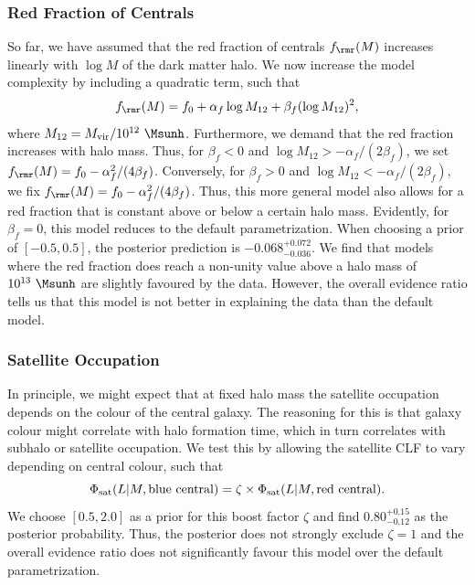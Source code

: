 \documentclass[fleqn,usenatbib,useAMS]{mnras}
\begin{document}
\subsubsection{Red Fraction of Centrals}

So far, we have assumed that the red fraction of centrals $f_\rmr (M)$ increases linearly with $\log M$ of the dark matter halo. We now increase the model complexity by including a quadratic term, such that
\begin{equation}
f_\rmr (M) = f_0 + \alpha_f \log M_{12} + \beta_f (\log M_{12})^2,
\end{equation}
where $M_{12} = M_{\rm vir} / 10^{12} \ \Msunh$. Furthermore, we demand that the red fraction increases with halo mass. Thus, for $\beta_f < 0$ and $\log M_{12} > - \alpha_f / (2 \beta_f)$, we set $f_\rmr (M) = f_0 - \alpha_f^2 / (4 \beta_f)$. Conversely, for $\beta_f > 0$ and $\log M_{12} < - \alpha_f / (2 \beta_f)$, we fix $f_\rmr (M) = f_0 - \alpha_f^2 / (4 \beta_f)$. Thus, this more general model also allows for a red fraction that is constant above or below a certain halo mass. Evidently, for $\beta_f = 0$, this model reduces to the default parametrization. When choosing a prior of $[-0.5, 0.5]$, the posterior prediction is $-0.068_{-0.036}^{+0.072}$. We find that models where the red fraction does reach a non-unity value above a halo mass of $10^{13} \ \Msunh$ are slightly favoured by the data. However, the overall evidence ratio tells us that this model is not better in explaining the data than the default model.

\subsubsection{Satellite Occupation}

In principle, we might expect that at fixed halo mass the satellite occupation depends on the colour of the central galaxy. The reasoning for this is that galaxy colour might correlate with halo formation time, which in turn correlates with subhalo or satellite occupation.  We test this by allowing the satellite CLF to vary depending on central colour, such that
\begin{equation}
\Phi_{\rm sat} (L | M , \mathrm{blue \ central}) = \zeta \times \Phi_{\rm sat} (L | M, \mathrm{red \ central}).
\end{equation}
We choose $[0.5, 2.0]$ as a prior for this boost factor $\zeta$ and find $0.80_{-0.12}^{+0.15}$ as the posterior probability. Thus, the posterior does not strongly exclude $\zeta = 1$ and the overall evidence ratio does not significantly favour this model over the default parametrization.
\end{document}
